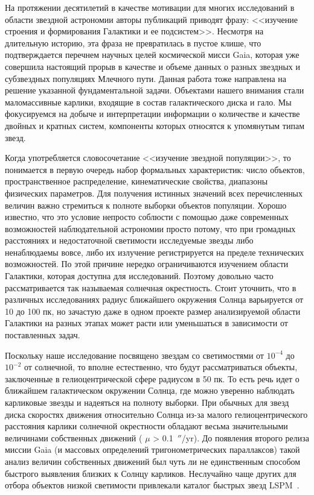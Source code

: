 {\actuality} На протяжении десятилетий в качестве мотивации для многих исследований в области звездной астрономии авторы публикаций приводят фразу: <<изучение строения и формирования Галактики и ее подсистем>>. Несмотря на длительную историю, эта фраза не превратилась в пустое клише, что подтверждается перечнем научных целей космической мисси Gaia, которая уже совершила настоящий прорыв в качестве и объеме данных о разных звездных и субзвездных популяциях Млечного пути. Данная работа тоже направлена на решение указанной фундаментальной задачи. Объектами нашего внимания стали маломассивные карлики, входящие в состав галактического диска и гало. Мы фокусируемся на добыче и интерпретации информации о количестве и качестве двойных и кратных систем, компоненты которых относятся к упомянутым типам звезд.

Когда употребляется словосочетание <<изучение звездной популяции>>, то понимается в первую очередь набор формальных характеристик: число объектов, пространственное распределение, кинематические свойства, диапазоны физических параметров. Для получения истинных значений всех перечисленных величин важно стремиться к полноте выборки объектов популяции. Хорошо известно, что это условие непросто соблюсти с помощью даже современных возможностей наблюдательной астрономии просто потому, что при громадных расстояниях и недостаточной светимости исследуемые звезды либо ненаблюдаемы вовсе, либо их излучение регистрируется на пределе технических возможностей. По этой причине нередко ограничиваются изучением области Галактики, которая доступна для исследований. Поэтому довольно часто рассматривается так называемая солнечная окрестность. Стоит уточнить, что в различных исследованиях радиус ближайшего окружения  Солнца варьируется от 10 до 100 пк, но зачастую даже в одном проекте размер анализируемой области Галактики на разных этапах может расти или уменьшаться в зависимости от поставленных задач.

Поскольку наше исследование посвящено звездам со светимостями от $10^{-4}$ до $10^{-2}$ от солнечной, то вполне естественно, что будут рассматриваться объекты, заключенные в гелиоцентрической сфере радиусом в 50 пк. То есть речь идет о ближайшем галактическом окружении Солнца, где можно уверенно наблюдать карликовые звезды и надеяться на полноту выборки. При обычных для звезд диска скоростях движения относительно Солнца из-за малого гелиоцентрического расстояния карлики солнечной окрестности обладают весьма значительными величинами собственных движений ( $\mu$ > 0.1~$''$/yr). До появления второго релиза миссии Gaia (и массовых определений тригонометрических параллаксов) такой анализ величин собственных движений был чуть ли не единственным способом быстрого выявления близких к Солнцу карликов. Неслучайно чаще других для отбора объектов низкой светимости привлекали каталог быстрых звезд LSPM~\cite{2005AJ....129.1483L}. 
 
